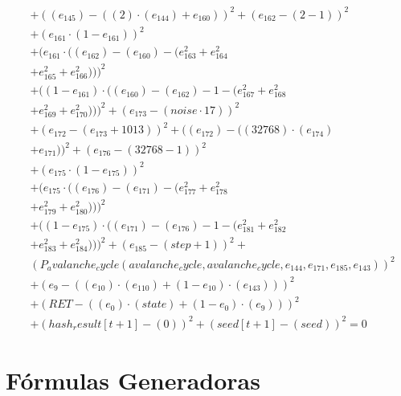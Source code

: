 \documentclass[10pt, a4paper]{article}
\begin{document}
\begin{align*}
& + ((e_{145}) - ((2)  \cdot  (e_{144}) + e_{160}))^{2} + (e_{162} - (2 - 1))^{2} \\
& + (e_{161}  \cdot  (1 - e_{161}))^{2} \\
& + (e_{161}  \cdot  ((e_{162}) - (e_{160}) - (e_{163}^{2} + e_{164}^{2} \\
& + e_{165}^{2} + e_{166}^{2})))^{2} \\
& + ((1 - e_{161})  \cdot  ((e_{160}) - (e_{162}) - 1 - (e_{167}^{2} + e_{168}^{2} \\
& + e_{169}^{2} + e_{170}^{2})))^{2} + (e_{173} - (noise  \cdot  17))^{2} \\
& + (e_{172} - (e_{173} + 1013))^{2} + ((e_{172}) - ((32768)  \cdot  (e_{174}) \\
& + e_{171}))^{2} + (e_{176} - (32768 - 1))^{2} \\
& + (e_{175}  \cdot  (1 - e_{175}))^{2} \\
& + (e_{175}  \cdot  ((e_{176}) - (e_{171}) - (e_{177}^{2} + e_{178}^{2} \\
& + e_{179}^{2} + e_{180}^{2})))^{2} \\
& + ((1 - e_{175})  \cdot  ((e_{171}) - (e_{176}) - 1 - (e_{181}^{2} + e_{182}^{2} \\
& + e_{183}^{2} + e_{184}^{2})))^{2} + (e_{185} - (step + 1))^{2} + \\
& (P_avalanche_cycle(avalanche_cycle, avalanche_cycle, e_{144}, e_{171}, e_{185}, e_{143}))^{2} \\
& + (e_{9} - ((e_{10})  \cdot  (e_{110}) + (1 - e_{10})  \cdot  (e_{143})))^{2} \\
& + (RET - ((e_{0})  \cdot  (state) + (1 - e_{0})  \cdot  (e_{9})))^{2} \\
& + (hash_result[t+1] - (0))^{2} + (seed[t+1] - (seed))^{2} = 0
\end{align*}\part{Fórmulas Generadoras}
\end{document}

